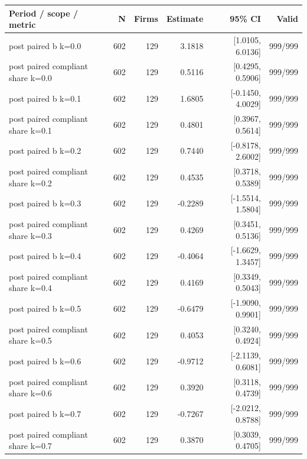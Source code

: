 \begingroup\scriptsize\setlength{\tabcolsep}{3pt}
\begin{threeparttable}
\begin{tabular}{p{6.0cm}rrrrr}
\toprule
Period / scope / metric & N & Firms & Estimate & 95\% CI & Valid \\
\midrule
post paired b k=0.0 & 602 & 129 & 3.1818 & [1.0105, 6.0136] & 999/999 \\
post paired compliant share k=0.0 & 602 & 129 & 0.5116 & [0.4295, 0.5906] & 999/999 \\
post paired b k=0.1 & 602 & 129 & 1.6805 & [-0.1450, 4.0029] & 999/999 \\
post paired compliant share k=0.1 & 602 & 129 & 0.4801 & [0.3967, 0.5614] & 999/999 \\
post paired b k=0.2 & 602 & 129 & 0.7440 & [-0.8178, 2.6002] & 999/999 \\
post paired compliant share k=0.2 & 602 & 129 & 0.4535 & [0.3718, 0.5389] & 999/999 \\
post paired b k=0.3 & 602 & 129 & -0.2289 & [-1.5514, 1.5804] & 999/999 \\
post paired compliant share k=0.3 & 602 & 129 & 0.4269 & [0.3451, 0.5136] & 999/999 \\
post paired b k=0.4 & 602 & 129 & -0.4064 & [-1.6629, 1.3457] & 999/999 \\
post paired compliant share k=0.4 & 602 & 129 & 0.4169 & [0.3349, 0.5043] & 999/999 \\
post paired b k=0.5 & 602 & 129 & -0.6479 & [-1.9090, 0.9901] & 999/999 \\
post paired compliant share k=0.5 & 602 & 129 & 0.4053 & [0.3240, 0.4924] & 999/999 \\
post paired b k=0.6 & 602 & 129 & -0.9712 & [-2.1139, 0.6081] & 999/999 \\
post paired compliant share k=0.6 & 602 & 129 & 0.3920 & [0.3118, 0.4739] & 999/999 \\
post paired b k=0.7 & 602 & 129 & -0.7267 & [-2.0212, 0.8788] & 999/999 \\
post paired compliant share k=0.7 & 602 & 129 & 0.3870 & [0.3039, 0.4705] & 999/999 \\
\bottomrule
\end{tabular}
\begin{tablenotes}[flushleft]\footnotesize

\end{tablenotes}
\end{threeparttable}
